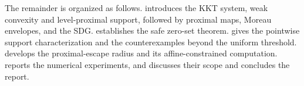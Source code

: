 The remainder is organized as follows.
 introduces the KKT system, weak convexity and
level-proximal support, followed by proximal maps, Moreau envelopes, and the
SDG.
 establishes the safe zero-set theorem.
 gives the pointwise support characterization and the
counterexamples beyond the uniform threshold.   develops
the proximal-escape radius and its affine-constrained computation.
 reports the numerical experiments, and
 discusses their scope and concludes the report.
